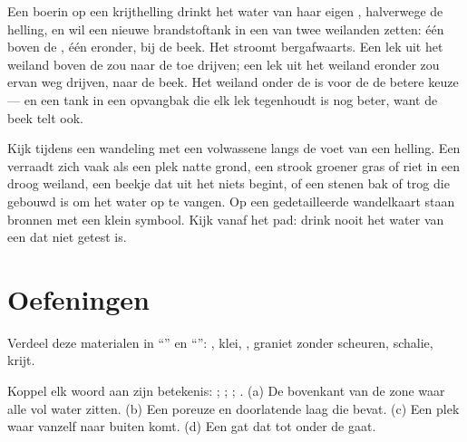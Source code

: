 \begin{example}\label{ex:g6:water-underground:tank}
Een boerin op een krijthelling drinkt het water van haar eigen ,
halverwege de helling, en wil een nieuwe brandstoftank in een van twee
weilanden zetten: één boven de , één eronder, bij de beek. Het
 stroomt bergafwaarts. Een lek uit het weiland boven de  zou
naar de  toe drijven; een lek uit het weiland eronder zou ervan weg
drijven, naar de beek. Het weiland onder de  is voor de  de betere
keuze --- en een tank in een opvangbak die elk lek tegenhoudt is nog
beter, want de beek telt ook.
\end{example}

\begin{inthefield}
Kijk tijdens een wandeling met een volwassene langs de voet van een
helling. Een  verraadt zich vaak als een plek natte grond, een strook
groener gras of riet in een droog weiland, een beekje dat uit het niets
begint, of een stenen bak of trog die gebouwd is om het water op te vangen.
Op een gedetailleerde wandelkaart staan bronnen met een klein symbool.
Kijk vanaf het pad: drink nooit het water van een  dat niet getest is.
\end{inthefield}

\section{Oefeningen}

\begin{exercise}[$\star$]\label{exo:g6:water-underground:1}
Verdeel deze materialen in ``'' en ``'': , klei,
, graniet zonder scheuren, schalie, krijt.
\end{exercise}

\begin{exercise}[$\star$]\label{exo:g6:water-underground:2}
Koppel elk woord aan zijn betekenis: ; ; ;
. (a) De bovenkant van de zone waar alle  vol
water zitten. (b) Een poreuze en doorlatende laag die  bevat.
(c) Een plek waar  vanzelf naar buiten komt. (d) Een gat dat tot
onder de  gaat.
\end{exercise}

